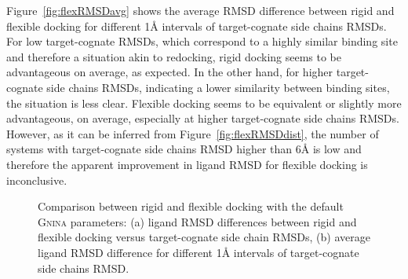 \documentclass[linenumbers,doublespacing]{bmcart}
\begin{document}
Figure~\ref{fig:flexRMSDavg} shows the average RMSD difference between rigid and flexible docking for different 1{\AA} intervals of target-cognate side chains RMSDs. For low target-cognate RMSDs, which correspond to a highly similar binding site and therefore a situation akin to redocking, rigid docking seems to be advantageous on average, as expected. In the other hand, for higher target-cognate side chains RMSDs, indicating a lower similarity between binding sites, the situation is less clear. Flexible docking seems to be equivalent or slightly more advantageous, on average, especially at higher target-cognate side chains RMSDs. However, as it can be inferred from Figure~\ref{fig:flexRMSDdist}, the number of systems with target-cognate side chains RMSD higher than 6{\AA} is low and therefore the apparent improvement in ligand RMSD for flexible docking is inconclusive.

\begin{figure}[tbh]  
	\caption{Comparison between rigid and flexible docking with the default \textsc{Gnina} parameters: (a) ligand RMSD differences between rigid and flexible docking versus target-cognate side chain RMSDs, (b) average ligand RMSD difference for different 1{\AA} intervals of target-cognate side chains RMSD.}
	\label{fig:flexCD}
\end{figure}
\end{document}
